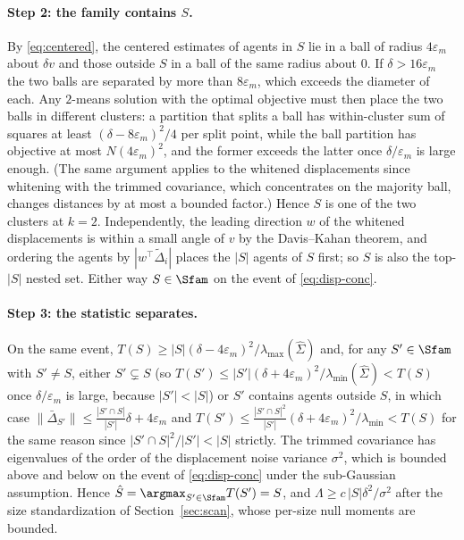 \paragraph{Step 2: the family contains $S$.}
By \eqref{eq:centered}, the centered estimates of agents in $S$ lie in a ball of radius $4\varepsilon_m$ about $\delta v$ and those outside $S$ in a ball of the same radius about $0$. If $\delta>16\varepsilon_m$ the two balls are separated by more than $8\varepsilon_m$, which exceeds the diameter of each. Any $2$-means solution with the optimal objective must then place the two balls in different clusters: a partition that splits a ball has within-cluster sum of squares at least $(\delta-8\varepsilon_m)^2/4$ per split point, while the ball partition has objective at most $N(4\varepsilon_m)^2$, and the former exceeds the latter once $\delta/\varepsilon_m$ is large enough. (The same argument applies to the whitened displacements since whitening with the trimmed covariance, which concentrates on the majority ball, changes distances by at most a bounded factor.) Hence $S$ is one of the two clusters at $k=2$. Independently, the leading direction $w$ of the whitened displacements is within a small angle of $v$ by the Davis--Kahan theorem, and ordering the agents by $|w^\top\tilde\Delta_i|$ places the $|S|$ agents of $S$ first; so $S$ is also the top-$|S|$ nested set. Either way $S\in\Sfam$ on the event of \eqref{eq:disp-conc}.

\paragraph{Step 3: the statistic separates.}
On the same event, $T(S)\ge|S|(\delta-4\varepsilon_m)^2/\lambda_{\max}(\hat\Sigma)$ and, for any $S'\in\Sfam$ with $S'\ne S$, either $S'\subsetneq S$ (so $T(S')\le|S'|(\delta+4\varepsilon_m)^2/\lambda_{\min}(\hat\Sigma)<T(S)$ once $\delta/\varepsilon_m$ is large, because $|S'|<|S|$) or $S'$ contains agents outside $S$, in which case $\|\bar\Delta_{S'}\|\le\frac{|S'\cap S|}{|S'|}\delta+4\varepsilon_m$ and $T(S')\le\frac{|S'\cap S|^2}{|S'|}(\delta+4\varepsilon_m)^2/\lambda_{\min}<T(S)$ for the same reason since $|S'\cap S|^2/|S'|<|S|$ strictly. The trimmed covariance has eigenvalues of the order of the displacement noise variance $\sigma^2$, which is bounded above and below on the event of \eqref{eq:disp-conc} under the sub-Gaussian assumption. Hence $\hat S=\argmax_{S'\in\Sfam}T(S')=S$, and $\Lambda\ge c\,|S|\delta^2/\sigma^2$ after the size standardization of Section~\ref{sec:scan}, whose per-size null moments are bounded.

